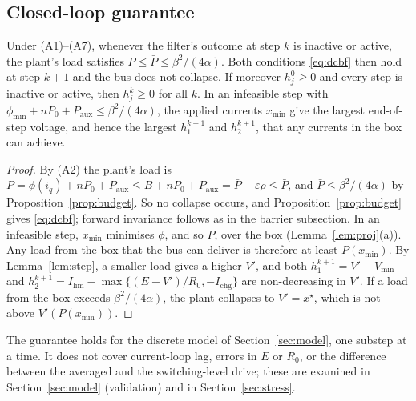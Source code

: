 \subsection{Closed-loop guarantee}
\begin{corollary}\label{cor:closed}
Under (A1)--(A7), whenever the filter's outcome at step $k$ is inactive or active, the plant's load satisfies $P\le\bar P\le\beta^2/(4\alpha)$. Both conditions \eqref{eq:dcbf} then hold at step $k+1$ and the bus does not collapse. If moreover $h_j^0\ge0$ and every step is inactive or active, then $h_j^k\ge0$ for all $k$.
In an infeasible step with $\phi_{\min}+nP_0+P_{\mathrm{aux}}\le\beta^2/(4\alpha)$, the applied currents $x_{\min}$ give the largest end-of-step voltage, and hence the largest $h_1^{k+1}$ and $h_2^{k+1}$, that any currents in the box can achieve.
\end{corollary}
\begin{proof}
By (A2) the plant's load is $P = \phi(i_q) + nP_0 + P_{\mathrm{aux}} \le B + nP_0 + P_{\mathrm{aux}} = \bar P - \varepsilon\rho \le \bar P$, and $\bar P\le\beta^2/(4\alpha)$ by Proposition~\ref{prop:budget}. So no collapse occurs, and Proposition~\ref{prop:budget} gives \eqref{eq:dcbf}; forward invariance follows as in the barrier subsection.
In an infeasible step, $x_{\min}$ minimises $\phi$, and so $P$, over the box (Lemma~\ref{lem:proj}(a)). Any load from the box that the bus can deliver is therefore at least $P(x_{\min})$. By Lemma~\ref{lem:step}, a smaller load gives a higher $V'$, and both $h_1^{k+1}=V'-V_{\min}$ and $h_2^{k+1}=I_{\lim}-\max\{(E-V')/R_0,-I_{\mathrm{chg}}\}$ are non-decreasing in $V'$. If a load from the box exceeds $\beta^2/(4\alpha)$, the plant collapses to $V'=x^\star$, which is not above $V'(P(x_{\min}))$.
\end{proof}
The guarantee holds for the discrete model of Section~\ref{sec:model}, one substep at a time. It does not cover current-loop lag, errors in $E$ or $R_0$, or the difference between the averaged and the switching-level drive; these are examined in Section~\ref{sec:model} (validation) and in Section~\ref{sec:stress}.
